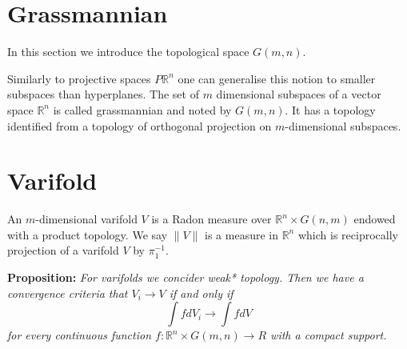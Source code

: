 \documentclass{article}
\begin{document}
\section{Grassmannian}

In this section we introduce the topological space $G(m,n)$.
\vspace{1ex}

Similarly to projective spaces $P\mathbb{R}^n$ one can generalise this notion to
smaller subspaces than hyperplanes. The set of $m$ dimensional subspaces of a
vector space $\mathbb{R}^n$ is called grassmannian and noted by $G(m,n)$. It
has a topology identified from a topology of orthogonal projection on
$m$-dimensional subspaces.

\section{Varifold}

An $m$-dimensional varifold $V$ is a Radon measure over $\mathbb{R}^n\times
G(n,m)$ endowed with a product topology. We say $\|V\|$ is a measure in
$\mathbb{R}^n$ which is reciprocally projection of a varifold $V$ by $\pi_1^{-1}$.

\vspace{2ex}
\textbf{Proposition:} \textit{For varifolds we concider weak* topology. Then we have a
convergence criteria that $V_i\rightarrow V$ if and only if
\[\int fdV_i\rightarrow\int fdV\]
for every continuous function $f:\mathbb{R}^n\times G(m,n)\rightarrow R$ with a
compact support.}
\vspace{1ex}

\medskip


\end{document}
